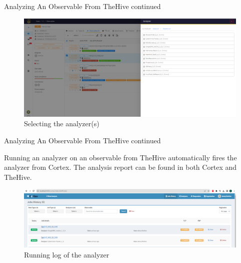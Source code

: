 \begin{frame}{Analyzing An Observable From TheHive continued}
 \begin{figure}[htp]
    \centering
    \includegraphics[scale = 0.27]{analyze-observables-2.png}
    \caption{Selecting the analyzer(s)}
    \label{fig:analyzing-observable-2}
\end{figure}   
\end{frame}

\begin{frame}{Analyzing An Observable From TheHive continued}
\begin{justify}
    Running an analyzer on an observable from TheHive automatically fires the analyzer from Cortex. The analysis report can be found in both Cortex and TheHive.
\end{justify}
 \begin{figure}[htp]
    \centering
    \includegraphics[width=1\textwidth]{analyze-observables-3.png}
    \caption{Running log of the analyzer}
    \label{fig:analyzing-observable-3}
\end{figure}
\end{frame}

